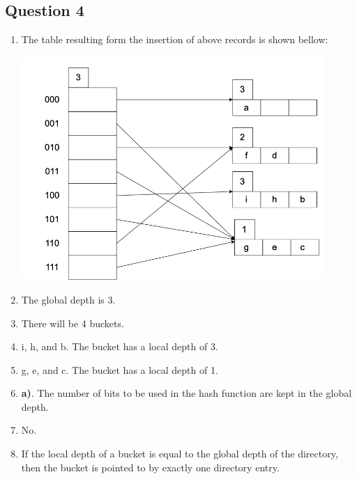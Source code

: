 \newpage
\subsection*{Question 4}

\begin{enumerate}[label={(\alph*)}]
    \item The table resulting form the insertion of above records is shown bellow:
        \begin{center}
            \includegraphics[width=0.9\textwidth]{img/img2.png}
        \end{center}
    
    \item The global depth is 3.
    
    \item There will be 4 buckets.
    
    \item i, h, and b. The bucket has a local depth of 3.
    
    \item g, e, and c. The bucket has a local depth of 1. 
    
    \item \textbf{a)}. The number of bits to be used in the hash function are kept in the global depth.
    
    \item No.
    
    \item If the local depth of a bucket is equal to the global depth of the directory, then the bucket is pointed to by exactly one directory entry. 
\end{enumerate}